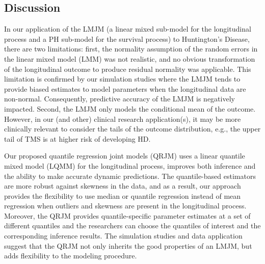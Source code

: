 








% 



\subsection{Discussion}\label{sec:discussion}
In our application of the LMJM (a linear mixed sub-model for the longitudinal process and a PH sub-model for the survival process) to Huntington's Disease, there are two limitations: first, the normality assumption of the random errors in the linear mixed model (LMM) was not realistic, and no obvious transformation of the longitudinal outcome to produce residual normality was applicable. This limitation is confirmed by our simulation studies where the LMJM tends to provide biased estimates to model parameters when the longitudinal data are non-normal. Consequently, predictive accuracy of the LMJM is negatively impacted. Second, the LMJM only models the conditional mean of the outcome. However, in our (and other) clinical research application(s), it may be more clinically relevant to consider the tails of the outcome distribution, e.g., the upper tail of TMS is at higher risk of developing HD.

Our proposed quantile regression joint models (QRJM) uses a linear quantile mixed model (LQMM) for the longitudinal process, improves both inference and the ability to make accurate dynamic predictions. The quantile-based estimators are more robust against skewness in the data, and as a result, our approach provides the flexibility to use median or quantile regression instead of mean regression when outliers and skewness are present in the longitudinal process. Moreover, the QRJM provides quantile-specific parameter estimates at a set of different quantiles and the researchers can choose the quantiles of interest and the corresponding inference results. The simulation studies and data application suggest that the QRJM not only inherits the good properties of an LMJM, but adds flexibility to the modeling procedure.

